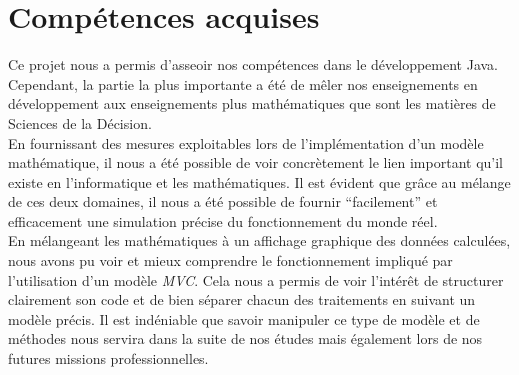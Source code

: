 \section{Compétences acquises}
	Ce projet nous a permis d'asseoir nos compétences dans le développement Java. Cependant, la partie la plus importante a été de mêler nos enseignements en développement aux enseignements plus mathématiques que sont les matières de Sciences de la Décision.\\
	
	En fournissant des mesures exploitables lors de l'implémentation d'un modèle mathématique, il nous a été possible de voir concrètement le lien important qu'il existe en l'informatique et les mathématiques. Il est évident que grâce au mélange de ces deux domaines, il nous a été possible de fournir ``facilement'' et efficacement une simulation précise du fonctionnement du monde réel.\\
	
	En mélangeant les mathématiques à un affichage graphique des données calculées, nous avons pu voir et mieux comprendre le fonctionnement impliqué par l'utilisation d'un modèle \textit{MVC}. Cela nous a permis de voir l'intérêt de structurer clairement son code et de bien séparer chacun des traitements en suivant un modèle précis. Il est indéniable que savoir manipuler ce type de modèle et de méthodes nous servira dans la suite de nos études mais également lors de nos futures missions professionnelles.
